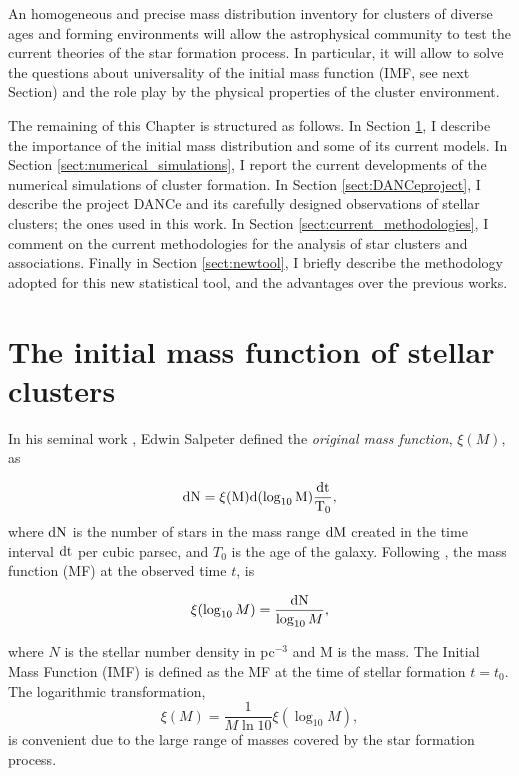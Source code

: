 An homogeneous and precise mass distribution inventory for clusters of diverse ages and forming environments will allow the astrophysical community to test the current theories of the star formation process. In particular, it will allow to solve the questions about universality of the initial mass function (IMF, see next Section) and the role play by the physical properties of the cluster environment.    

The remaining of this Chapter is structured as follows. In Section \ref{sect:IMF}, I describe the importance of the initial mass distribution and some of its current models. In Section \ref{sect:numerical_simulations}, I report the current developments of the numerical simulations of cluster formation. In Section \ref{sect:DANCeproject}, I describe the project DANCe and its carefully designed observations of stellar clusters; the ones used in this work. In Section \ref{sect:current_methodologies}, I comment on the current methodologies for the analysis of star clusters and associations. Finally in Section \ref{sect:newtool}, I briefly describe the methodology adopted for this new statistical tool, and the advantages over the previous works. 

\section{The initial mass function of stellar clusters}
\label{sect:IMF}

In his seminal work \citep{Salpeter1955}, Edwin Salpeter defined the \emph{original mass function}, $\xi(M)$, as

\begin{equation}
\rm{d}N= \xi(M)\rm{d}(\log_{10} M) \frac{\rm{d}t}{T_0},
\end{equation}
where $\rm{d}N$ is the number of stars in the mass range $\rm{d}M$ created in the time interval $\rm{d}t$ per cubic parsec, and $T_0$ is the age of the galaxy. Following \citet{Chabrier2003b},  the mass function (MF) at the observed time $t$, is

\begin{equation}
\xi(\log_{10} M)=\frac{\rm{d}N}{\log_{10} M},
\end{equation}

where $N$ is the stellar number density in pc$^{-3}$ and M is the mass. The Initial Mass Function (IMF) is defined as the MF at the time of stellar formation $t=t_0$. The logarithmic transformation,
\begin{equation}
\xi(M)=\frac{1}{M \ln 10} \xi (\log_{10} M),
\end{equation}
is convenient due to the large range of masses covered by the star formation process.

